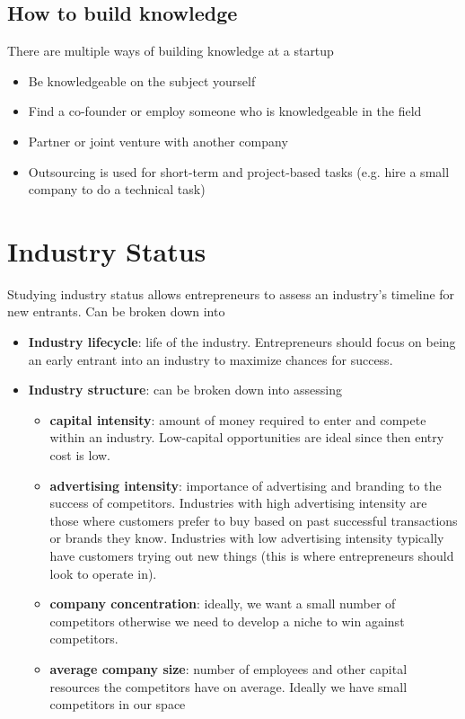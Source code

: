 \documentclass{article}
\begin{document}
  \subsection{How to build knowledge}
  There are multiple ways of building knowledge at a startup
  \begin{itemize}
    \item Be knowledgeable on the subject yourself
    \item Find a co-founder or employ someone who is knowledgeable in the field
    \item Partner or joint venture with another company
    \item Outsourcing is used for short-term and project-based tasks (e.g. hire a small company to do a technical task)
  \end{itemize}
  \section{Industry Status}
  Studying industry status allows entrepreneurs to assess an industry's timeline for new entrants. Can be broken down into
  \begin{itemize}
    \item \textbf{Industry lifecycle}: life of the industry. Entrepreneurs should focus on being an early entrant into an industry to maximize chances for success.
    \item \textbf{Industry structure}: can be broken down into assessing
      \begin{itemize}
        \item \textbf{capital intensity}: amount of money required to enter and compete within an industry. Low-capital opportunities are ideal since then entry cost is low.
        \item \textbf{advertising intensity}: importance of advertising and branding to the success of competitors. Industries with high advertising intensity are those where customers prefer to buy based on past successful transactions or brands they know. Industries with low advertising intensity typically have customers trying out new things (this is where entrepreneurs should look to operate in).
        \item \textbf{company concentration}: ideally, we want a small number of competitors otherwise we need to develop a niche to win against competitors. 
        \item \textbf{average company size}: number of employees and other capital resources the competitors have on average. Ideally we have small competitors in our space
      \end{itemize}
  \end{itemize}
\end{document}
